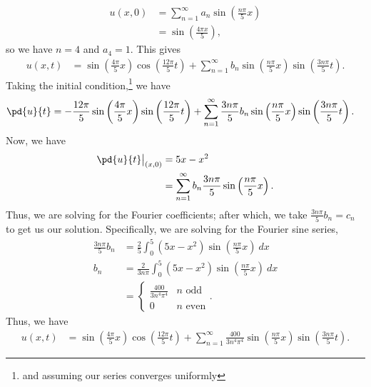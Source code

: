\documentclass[10pt]{mypackage}
\begin{document}
\begin{example}
  \begin{align*}
    u\left( x,0 \right) &= \sum_{n=1}^{\infty}a_n\sin\left( \frac{n\pi }{5}x \right)\\
                        &= \sin\left( \frac{4\pi x}{5} \right),
  \end{align*}
  so we have $n =4$ and $a_4=1$. This gives
  \begin{align*}
    u\left( x,t \right) &= \sin\left( \frac{4\pi }{5} x\right)\cos\left( \frac{12\pi}{5}t \right) + \sum_{n=1}^{\infty}b_n\sin\left( \frac{n\pi}{5}x \right)\sin\left( \frac{3n\pi}{5}t \right).
  \end{align*}
  Taking the initial condition,\footnote{and assuming our series converges uniformly} we have
  \begin{align*}
    \pd{u}{t} &= -\frac{12 \pi}{5}\sin\left( \frac{4\pi}{5}x \right)\sin\left( \frac{12\pi}{5}t \right) + \sum_{n=1}^{\infty}\frac{3n\pi}{5}b_n\sin\left( \frac{n\pi}{5}x \right)\sin\left( \frac{3n\pi}{5}t \right).
  \end{align*}
  Now, we have
  \begin{align*}
    \pd{u}{t}\bigr\vert_{(x,0)} &= 5x-x^2\\
                                &= \sum_{n=1}^{\infty}b_n\frac{3n\pi }{5}\sin\left( \frac{n\pi }{5}x \right).
  \end{align*}
  Thus, we are solving for the Fourier coefficients; after which, we take $\frac{3n\pi}{5}b_n = c_n$ to get us our solution. Specifically, we are solving for the Fourier sine series,
  \begin{align*}
    \frac{3n\pi}{5}b_n &= \frac{2}{5} \int_{0}^{5} \left( 5x-x^2 \right)\sin\left( \frac{n\pi}{5}x \right)\:dx\\
    b_n &= \frac{2}{3n\pi}\int_{0}^{5} \left( 5x-x^2 \right)\sin\left( \frac{n\pi}{5}x \right)\:dx\\
        &= \begin{cases}
          \frac{400}{3n^4\pi^4} & \text{$n$ odd}\\
          0 & \text{$n$ even}
        \end{cases}.
  \end{align*}
  Thus, we have
  \begin{align*}
    u\left( x,t \right) &= \sin\left( \frac{4\pi }{5}x \right)\cos\left( \frac{12 \pi}{5}t \right) + \sum_{n=1}^{\infty}\frac{400}{3n^4\pi^4}\sin\left( \frac{n\pi}{5}x \right)\sin\left( \frac{3n\pi}{5}t \right).
  \end{align*}
\end{example}
\end{document}

